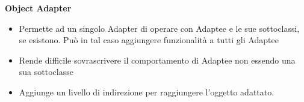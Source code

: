 \textbf{Object Adapter}
\begin{itemize}
    \item Permette ad un singolo Adapter di operare con Adaptee e le sue sottoclassi, se esistono. Può in tal caso aggiungere funzionalità a tutti gli Adaptee
    \item Rende difficile sovrascrivere il comportamento di Adaptee non essendo una sua sottoclasse
    \item Aggiunge un livello di indirezione per raggiungere l'oggetto adattato.
\end{itemize}

\newpage